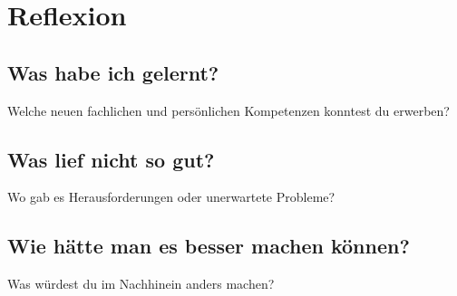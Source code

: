 
\section{Reflexion}
\label{chap:reflexion}

\subsection{Was habe ich gelernt?}
\label{sec:gelernt}
Welche neuen fachlichen und persönlichen Kompetenzen konntest du erwerben?

\subsection{Was lief nicht so gut?}
\label{sec:schwierigkeiten}
Wo gab es Herausforderungen oder unerwartete Probleme?

\subsection{Wie hätte man es besser machen können?}
\label{sec:verbesserung}
Was würdest du im Nachhinein anders machen?